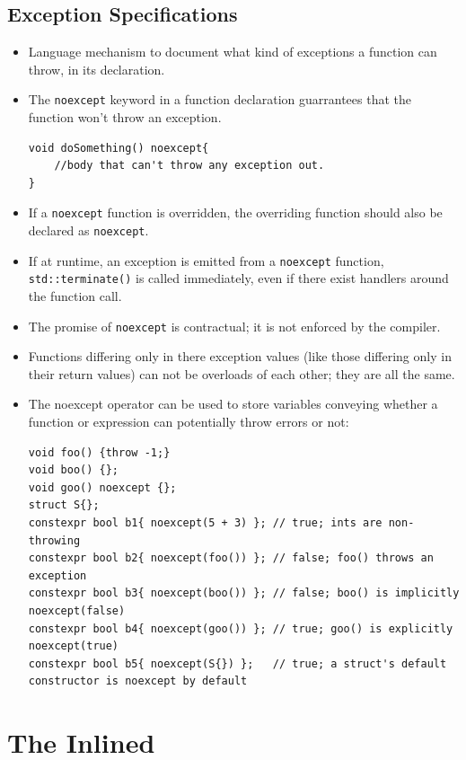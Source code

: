 \documentclass{report}
\begin{document}
\subsection{Exception Specifications}
\begin{itemize}
\item Language mechanism to document what kind of exceptions a function can throw, in its declaration.
\item The \texttt{noexcept} keyword in a function declaration guarrantees that the function won't throw an exception.
\begin{lstlisting}
void doSomething() noexcept{
    //body that can't throw any exception out.   
}
\end{lstlisting}
\item If a \texttt{noexcept} function is overridden,
the overriding function should also be declared as \texttt{noexcept}.
\item If at runtime, an exception is emitted from a \texttt{noexcept} function,
\texttt{std::terminate()} is called immediately, even if there exist handlers around
the function call.
\item The promise of \texttt{noexcept} is contractual; it is not enforced by the compiler.
\item Functions differing only in there exception values (like those differing only in their 
return values) can not be overloads of each other; they are all the same.
\item The noexcept operator can be used to store variables conveying whether a function or
expression can potentially throw errors or not:
\begin{lstlisting}
void foo() {throw -1;}
void boo() {};
void goo() noexcept {};
struct S{};
constexpr bool b1{ noexcept(5 + 3) }; // true; ints are non-throwing
constexpr bool b2{ noexcept(foo()) }; // false; foo() throws an exception
constexpr bool b3{ noexcept(boo()) }; // false; boo() is implicitly noexcept(false)
constexpr bool b4{ noexcept(goo()) }; // true; goo() is explicitly noexcept(true)
constexpr bool b5{ noexcept(S{}) };   // true; a struct's default constructor is noexcept by default
\end{lstlisting}
\end{itemize}
\section{The Inlined}
\end{document}
